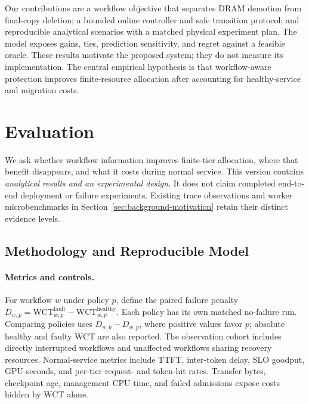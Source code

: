 \documentclass[sigplan,10pt,anonymous,nonacm]{acmart}
\begin{document}
Our contributions are a workflow objective that separates DRAM demotion
from final-copy deletion; a bounded online controller and safe transition
protocol; and reproducible analytical scenarios with a matched physical
experiment plan. The model exposes gains, ties, prediction sensitivity,
and regret against a feasible oracle. These results motivate the proposed
system; they do not measure its implementation. The central empirical
hypothesis is that workflow-aware protection improves finite-resource
allocation after accounting for healthy-service and migration costs.




\section{Evaluation}
\label{sec:evaluation}

We ask whether workflow information improves finite-tier allocation,
where that benefit disappears, and what it costs during normal service.
This version contains \emph{analytical results and an experimental design}.
It does not claim completed end-to-end deployment or failure experiments.
Existing trace observations and worker microbenchmarks in
Section~\ref{sec:background-motivation} retain their distinct evidence levels.

\subsection{Methodology and Reproducible Model}
\label{sec:eval-method}

\paragraph{Metrics and controls.}
For workflow $w$ under policy $p$, define the paired failure penalty
$D_{w,p}=\mathrm{WCT}^{\mathrm{fault}}_{w,p}-\mathrm{WCT}^{\mathrm{healthy}}_{w,p}$.
Each policy has its own matched no-failure run. Comparing policies uses
$D_{w,b}-D_{w,p}$, where positive values favor $p$; absolute healthy and
faulty WCT are also reported. The observation cohort includes directly
interrupted workflows and unaffected workflows sharing recovery resources.
Normal-service metrics include TTFT, inter-token delay, SLO goodput,
GPU-seconds, and per-tier request- and token-hit rates. Transfer bytes,
checkpoint age, management CPU time, and failed admissions expose costs
hidden by WCT alone.
\end{document}
